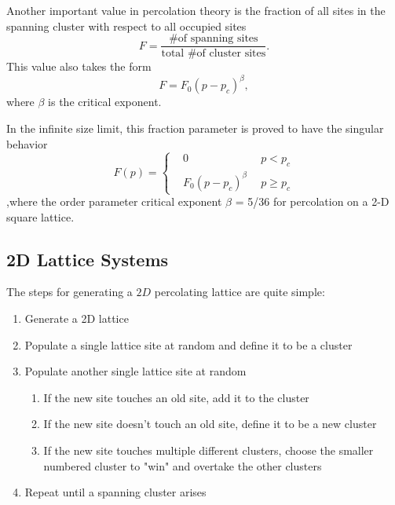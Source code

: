 \documentclass[12pt]{article}
\begin{document}
Another important value in percolation theory is the fraction of all sites in the spanning cluster with respect to all occupied sites
\begin{equation}
  \label{eq:fraction}
  F = \frac{\text{\# of spanning sites}}{\text{total \# of cluster sites}}.
  \end{equation}
This value also takes the form
\begin{equation}
  \label{eq:spanningfraction}
  F = F_0 \left(p - p_c\right)^\beta,
\end{equation}
where $\beta$ is the critical exponent.

In the infinite size limit, this fraction parameter is proved to have the singular behavior
\begin{equation}
  \label{eq:spanningfraction2}
F(p) =\left\{
\begin{aligned}
&0 \ \ & p<p_c \\
&F_0(p-p_c)^\beta \ \ & p\geq p_c 
\end{aligned}
\right.
\end{equation}
,where the order parameter critical exponent $\beta$ = 5/36 for percolation on a 2-D square lattice.


\subsection{2D Lattice Systems}
\label{sec:lattice}

The steps for generating a $2D$ percolating lattice are quite simple:
\begin{enumerate}
  \label{code:percolatinglattice}
  \item Generate a 2D lattice
  \item Populate a single lattice site at random and define it to be a cluster
  \item Populate another single lattice site at random
  \begin{enumerate}
    \item If the new site touches an old site, add it to the cluster
    \item If the new site doesn't touch an old site, define it to be a new cluster
    \item If the new site touches multiple different clusters, choose the smaller numbered cluster to "win" and overtake the other clusters
  \end{enumerate}
  \item Repeat until a spanning cluster arises
\end{enumerate}
\end{document}
